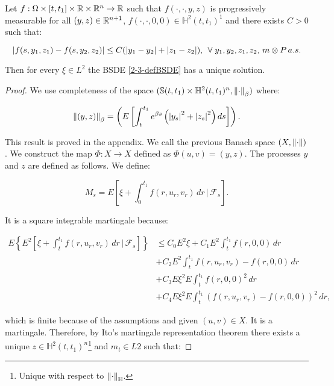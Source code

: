 \begin{theorem}
    Let $f:\Omega\times[t,t_1]\times\mathbb{R}\times\mathbb{R}^n\rightarrow \mathbb{R}$ such that $f(\cdot,\cdot,y,z)$ is progressively measurable for all 
    $(y,z)\in\mathbb{R}^{n+1}$, $f(\cdot,\cdot,0,0)\in\mathbb{H}^2(t,t_1)^1$ and there exists $C>0$ such that:

    \begin{equation}
        \abs{f(s,y_1,z_1)-f(s,y_2,z_2)} \leq C(\abs{y_1-y_2} + \abs{z_1-z_2}),\,\forall y_1,y_2,z_1,z_2,\, m\otimes P\,a.s.
    \end{equation}

    Then for every $\xi\in L^2$ the BSDE \ref{2-3-defBSDE} has a unique solution.

    \begin{proof}
        We use completeness of the space $(\mathbb{S}(t,t_1)\times\mathbb{H}^2(t,t_1)^n, \norm{\cdot}_{\beta})$ where:

        \begin{equation}
            \norm{(y,z)}_{\beta} = \left(E\left[\int_t^{t_1} e^{\beta s}\left(\abs{y_s}^2+\abs{z_s}^2\right)ds\right]\right).
        \end{equation}

        This result is proved in the appendix. We call the previous Banach space $(X,\norm{\cdot})$. We construct the map 
        $\Phi:X\rightarrow X$ defined as $\Phi(u,v)=(y,z)$. The processes $y$ and $z$ are defined as follows. We define:

        \begin{equation}
            M_s = E\left[\xi + \int_0^{t_1} f(r,u_r,v_r)\,dr\,|\,\mathcal{F}_s\right].
        \end{equation}

        It is a square integrable martingale because:
        
        \begin{align*}
            E\left\{E^2\left[\xi + \int_t^{t_1} f(r,u_r,v_r)\,dr\,|\,\mathcal{F}_s\right]\right\} & \leq C_0 E^2\xi + C_1E^2\int_t^{t_1} f(r,0,0)\,dr \\
            & + C_2E^2\int_t^{t_1} f(r,u_r,v_r)-f(r,0,0)\,dr \\
            & + C_3E\xi^2E\int_t^{t_1}f(r,0,0)^2\,dr \\
            & + C_4E\xi^2E\int_t^{t_1}(f(r,u_r,v_r)-f(r,0,0))^2\,dr, 
        \end{align*}

        which is finite because of the assumptions and given $(u,v)\in X$. It is a martingale. Therefore, by 
        Ito's martingale representation theorem there exists a unique $z\in\mathbb{H}^2(t,t_1)^n$\footnote{Unique with respect to $\norm{\cdot}_{\mathbb{H}}$.} and $m_t\in L2$ such that:
        

\end{proof}
\end{theorem}
